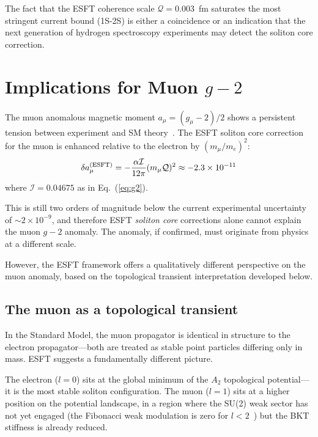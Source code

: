 ﻿\documentclass[twocolumn,preprintnumbers,amsmath,amssymb]{revtex4-2}
\newcommand{\Qoppa}{\mathcal{Q}}
\begin{document}
The fact that the ESFT coherence scale $\Qoppa = 0.003$~fm saturates the most stringent current bound (1S-2S) is either a coincidence or an indication that the next generation of hydrogen spectroscopy experiments may detect the soliton core correction.

\section{Implications for Muon $g{-}2$}
\label{sec:muon_g2}

The muon anomalous magnetic moment $a_\mu = (g_\mu - 2)/2$ shows a persistent tension between experiment and SM theory~\cite{Muong2_2023}. The ESFT soliton core correction for the muon is enhanced relative to the electron by $(m_\mu/m_e)^2$:
\begin{equation}
\delta a_\mu^{(\rm ESFT)} = -\frac{\alpha \mathcal{I}}{12\pi}(m_\mu \Qoppa)^2 \approx -2.3 \times 10^{-11}
\label{eq:muon_g2}
\end{equation}
where $\mathcal{I} = 0.04675$ as in Eq.~(\ref{eq:g2}).

This is still two orders of magnitude below the current experimental uncertainty of $\sim 2 \times 10^{-9}$, and therefore ESFT \emph{soliton core} corrections alone cannot explain the muon $g{-}2$ anomaly. The anomaly, if confirmed, must originate from physics at a different scale.

However, the ESFT framework offers a qualitatively different perspective on the muon anomaly, based on the topological transient interpretation developed below.

\subsection{The muon as a topological transient}

In the Standard Model, the muon propagator is identical in structure to the electron propagator---both are treated as stable point particles differing only in mass. ESFT suggests a fundamentally different picture.

The electron ($l = 0$) sits at the global minimum of the $A_2$ topological potential---it is the most stable soliton configuration. The muon ($l = 1$) sits at a higher position on the potential landscape, in a region where the SU(2) weak sector has not yet engaged (the Fibonacci weak modulation is zero for $l < 2$~\cite{Paper7}) but the BKT stiffness is already reduced.
\end{document}

